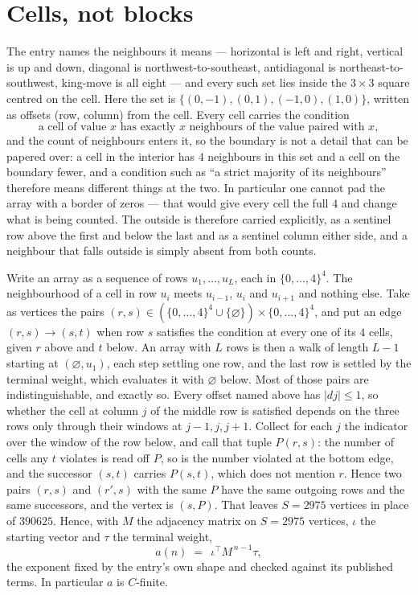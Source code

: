 \documentclass[11pt,a4paper]{article}
\theoremstyle{plain}
\theoremstyle{definition}
\begin{document}
\section{Cells, not blocks}

The entry names the neighbours it means --- horizontal is left and right, vertical is up and
down, diagonal is northwest-to-southeast, antidiagonal is northeast-to-southwest, king-move is
all eight --- and every such set lies inside the $3\times3$ square centred on the cell. Here
the set is $\{(0,-1), (0,1), (-1,0), (1,0)\}$, written as offsets (row, column) from the cell. Every cell carries
the condition
\[
\text{a cell of value }x\text{ has exactly }x\text{ neighbours of the value paired with }x,
\]
and the count of neighbours enters it, so the boundary is not a detail that can be papered
over: a cell in the interior has $4$ neighbours in this set and a cell on the boundary
fewer, and a condition such as ``a strict majority of its neighbours'' therefore means
different things at the two. In particular one cannot pad the array with a border of zeros ---
that would give every cell the full $4$ and change what is being counted. The outside is
therefore carried
explicitly, as a sentinel row above the first and below the last and as a sentinel column
either side, and a neighbour that falls outside is simply absent from both counts.

Write an array as a sequence of rows $u_1,\dots,u_L$, each in
$\{0,\dots,4\}^{4}$. The neighbourhood of a cell in row $u_i$ meets $u_{i-1}$,
$u_i$ and $u_{i+1}$ and nothing else. Take as vertices the pairs
$(r,s)\in(\{0,\dots,4\}^{4}\cup\{\varnothing\})\times\{0,\dots,4\}^{4}$,
and put an edge $(r,s)\to(s,t)$ when row $s$ satisfies the condition at every one of its
$4$ cells, given $r$ above and $t$ below. An array with $L$ rows is then a walk of length
$L-1$ starting at $(\varnothing,u_1)$, each step settling one row, and the last row is
settled by the terminal weight, which evaluates it with $\varnothing$ below. Most of those pairs are indistinguishable, and exactly so. Every offset named above has $|dj|\le 1$, so whether the cell at column $j$ of the middle row is satisfied depends on the three rows only through their windows at $j-1,j,j+1$. Collect for each $j$ the indicator over the window of the row below, and call that tuple $P(r,s)$: the number of cells any $t$ violates is read off $P$, so is the number violated at the bottom edge, and the successor $(s,t)$ carries $P(s,t)$, which does not mention $r$. Hence two pairs $(r,s)$ and $(r',s)$ with the same $P$ have the same outgoing rows and the same successors, and the vertex is $(s,P)$. That leaves $S=2975$ vertices in place of $390625$. Hence,
with $M$ the adjacency matrix on $S=2975$ vertices, $\iota$ the starting vector and $\tau$ the
terminal weight,
\[
a(n)\;=\;\,\iota^{\!\top}M^{\,n-1}\tau ,
\]
the exponent fixed by the entry's own shape and checked against its published terms. In
particular $a$ is $C$-finite.
\end{document}
